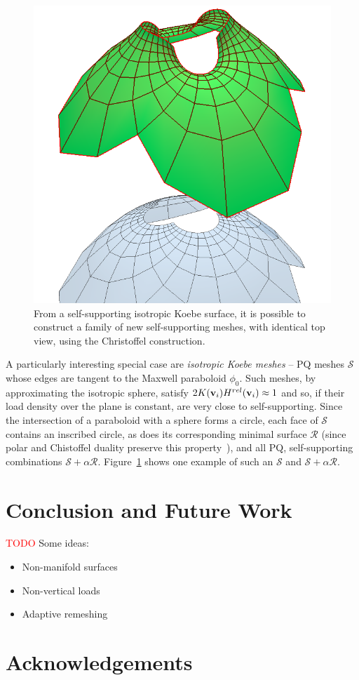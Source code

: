 \documentclass[annual]{acmsiggraph}
\def\SS{{\mathcal S}}
\def\RR{{\mathcal R}}
\newcommand{\todo}[1]{\textcolor{red}{#1}}
\begin{document}
 \begin{figure}[ht]
  \includegraphics[width=.45\columnwidth]{fig/enneper}
\begin{minipage}[b]{.48\columnwidth}	
 \caption{From a self-supporting isotropic Koebe surface, it is possible to construct a family of new
self-supporting meshes, with identical top view, using the Christoffel construction. \label{fig:enneper}}
\end{minipage}
 \end{figure}

A particularly interesting special case are \emph{isotropic Koebe meshes} -- PQ meshes $\SS$ whose edges
are tangent to the Maxwell paraboloid $\phi_0$. Such meshes, by approximating the isotropic sphere,
satisfy $2K({\mathbf v}_i) H^{rel}({\mathbf v}_i) \approx 1$ and so, if their load density over the plane is constant,
are very close to self-supporting. Since the intersection of a paraboloid with a sphere forms a circle,
each face of $\SS$ contains an inscribed circle, as does its corresponding minimal surface $\RR$ (since polar and Chistoffel duality
preserve this property~\cite{Pottmann2007}), and all PQ, self-supporting combinations $\SS + \alpha \RR$.
Figure~\ref{fig:enneper} shows one example of such an $\SS$ and $\SS+\alpha \RR$.

\section{Conclusion and Future Work}

\todo{TODO}
Some ideas:
\begin{itemize}
\item{Non-manifold surfaces}
\item{Non-vertical loads}
\item{Adaptive remeshing}
\end{itemize}

\section*{Acknowledgements}




\let\otb=\thebibliography
\def\thebibliography#1{\otb{#1}\itemsep-1pt}

\end{document}
